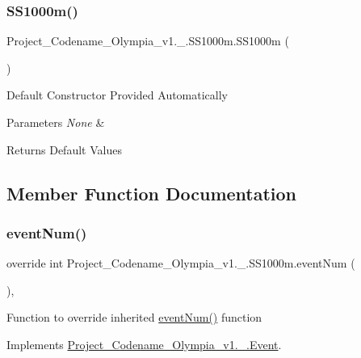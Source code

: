 \subsubsection{\texorpdfstring{S\+S1000m()}{SS1000m()}}
{\footnotesize\ttfamily Project\+\_\+\+Codename\+\_\+\+Olympia\+\_\+v1.\+\_.\+S\+S1000m.\+S\+S1000m (\begin{DoxyParamCaption}{ }\end{DoxyParamCaption})\hspace{0.3cm}{\ttfamily [inline]}}

Default Constructor Provided Automatically 
\begin{DoxyParams}{Parameters}
{\em None} & \\
\hline
\end{DoxyParams}
\begin{DoxyReturn}{Returns}
Default Values 
\end{DoxyReturn}


\subsection{Member Function Documentation}
\mbox{\label{classProject__Codename__Olympia__v1_1_1__0_1_1SS1000m_aea0a2bb558a0b5f1ee0cae54a9e12ea9}} 
\subsubsection{\texorpdfstring{event\+Num()}{eventNum()}}
{\footnotesize\ttfamily override int Project\+\_\+\+Codename\+\_\+\+Olympia\+\_\+v1.\+\_.\+S\+S1000m.\+event\+Num (\begin{DoxyParamCaption}{ }\end{DoxyParamCaption})\hspace{0.3cm}{\ttfamily [inline]}, {\ttfamily [virtual]}}

Function to override inherited \hyperlink{classProject__Codename__Olympia__v1_1_1__0_1_1SS1000m_aea0a2bb558a0b5f1ee0cae54a9e12ea9}{event\+Num()} function 

Implements \hyperlink{classProject__Codename__Olympia__v1_1_1__0_1_1Event_ad1154ef4dd1dec29d8ebf5614d84b1f3}{Project\+\_\+\+Codename\+\_\+\+Olympia\+\_\+v1.\+\_.\+Event}.

